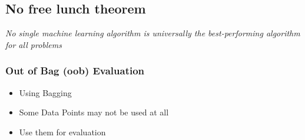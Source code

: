 \subsection{No free lunch theorem}
\textit{No single machine learning algorithm is universally the best-performing algorithm for all problems}

\subsubsection{Out of Bag (oob) Evaluation}
\begin{itemize}
    \item Using Bagging
    \item Some Data Points may not be used at all
    \item Use them for evaluation 
\end{itemize}